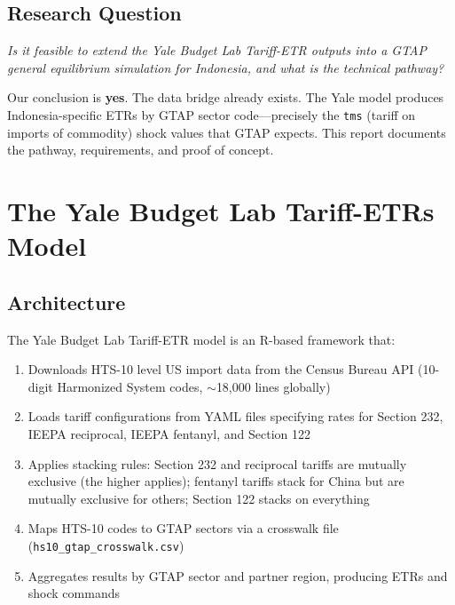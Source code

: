 \documentclass[12pt,a4paper]{article}
\begin{document}
\subsection{Research Question}

\textit{Is it feasible to extend the Yale Budget Lab Tariff-ETR outputs into a GTAP general equilibrium simulation for Indonesia, and what is the technical pathway?}

Our conclusion is \textbf{yes}. The data bridge already exists. The Yale model produces Indonesia-specific ETRs by GTAP sector code---precisely the \texttt{tms} (tariff on imports of commodity) shock values that GTAP expects. This report documents the pathway, requirements, and proof of concept.

\section{The Yale Budget Lab Tariff-ETRs Model}
\label{sec:yale_model}

\subsection{Architecture}

The Yale Budget Lab Tariff-ETR model \cite{yalebudgetlab_model} is an R-based framework that:

\begin{enumerate}
    \item Downloads HTS-10 level US import data from the Census Bureau API (10-digit Harmonized System codes, $\sim$18,000 lines globally)
    \item Loads tariff configurations from YAML files specifying rates for Section 232, IEEPA reciprocal, IEEPA fentanyl, and Section 122
    \item Applies stacking rules: Section 232 and reciprocal tariffs are mutually exclusive (the higher applies); fentanyl tariffs stack for China but are mutually exclusive for others; Section 122 stacks on everything
    \item Maps HTS-10 codes to GTAP sectors via a crosswalk file (\texttt{hs10\_gtap\_crosswalk.csv})
    \item Aggregates results by GTAP sector and partner region, producing ETRs and shock commands
\end{enumerate}
\end{document}
